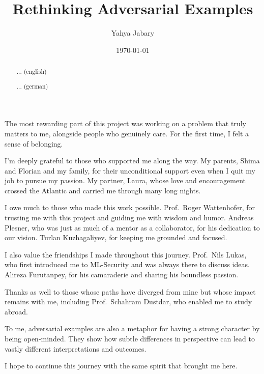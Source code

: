 \documentclass[a4paper, oneside]{discothesis}
\title{Rethinking Adversarial Examples}
\author{Yahya Jabary}
\institute{Computer Engineering and Networks Laboratory \\[2pt] ETH Zürich}
\date{\today}
\begin{document}
\frontmatter
\maketitle

\cleardoublepage

\begin{acknowledgements}
	The most rewarding part of this project was working on a problem that truly matters to me, alongside people who genuinely care. For the first time, I felt a sense of belonging.

	I'm deeply grateful to those who supported me along the way. My parents, Shima and Florian and my family, for their unconditional support \textendash{} even when I quit my job to pursue my passion. My partner, Laura, whose love and encouragement crossed the Atlantic and carried me through many long nights.

	I owe much to those who made this work possible. Prof.\ Roger Wattenhofer, for trusting me with this project and guiding me with wisdom and humor. Andreas Plesner, who was just as much of a mentor as a collaborator, for his dedication to our vision. Turlan Kuzhagaliyev, for keeping me grounded and focused.

	I also value the friendships I made throughout this journey. Prof.\ Nils Lukas, who first introduced me to ML-Security and was always there to discuss ideas. Alireza Furutanpey, for his camaraderie and sharing his boundless passion.

	Thanks as well to those whose paths have diverged from mine but whose impact remains with me, including Prof.\ Schahram Dustdar, who enabled me to study abroad.

	To me, adversarial examples are also a metaphor for having a strong character by being open-minded. They show how subtle differences in perspective can lead to vastly different interpretations and outcomes.
	
	I hope to continue this journey with the same spirit that brought me here.
\end{acknowledgements}

\begin{abstract}
	... (english)
\end{abstract}

\begin{abstract}

	... (german)
\end{abstract}
\end{document}
